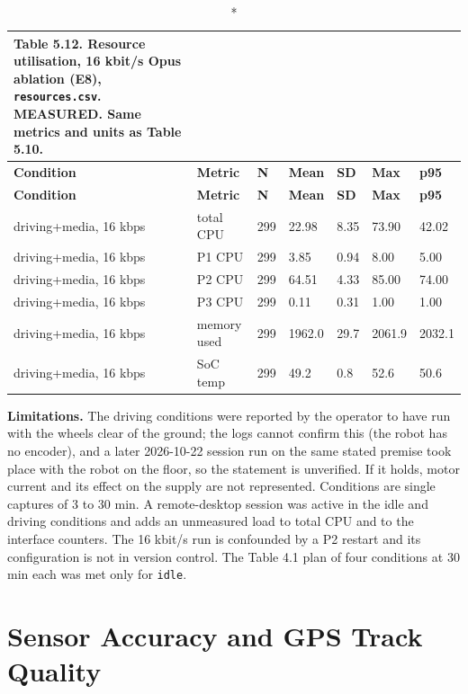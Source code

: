 \begin{center}
\footnotesize
\begin{longtable}{|p{4cm}|p{2.3cm}|l|l|l|l|l|}
\caption*{Table 5.12. Resource utilisation, 16 kbit/s Opus ablation (E8), \texttt{resources.csv}. MEASURED. Same metrics and units as Table 5.10.}
\addcontentsline{lot}{table}{\protect\numberline{5.12}Resource utilisation, 16 kbit/s Opus ablation (E8), \texttt{resources.csv}. MEASURED. Same metrics and units as Table 5.10.}
\\
\hline
\textbf{Condition} & \textbf{Metric} & \textbf{N} & \textbf{Mean} & \textbf{SD} & \textbf{Max} & \textbf{p95} \\
\hline
\endfirsthead
\hline
\textbf{Condition} & \textbf{Metric} & \textbf{N} & \textbf{Mean} & \textbf{SD} & \textbf{Max} & \textbf{p95} \\
\hline
\endhead
driving+media, 16 kbps & total CPU & 299 & 22.98 & 8.35 & 73.90 & 42.02 \\
\hline
driving+media, 16 kbps & P1 CPU & 299 & 3.85 & 0.94 & 8.00 & 5.00 \\
\hline
driving+media, 16 kbps & P2 CPU & 299 & 64.51 & 4.33 & 85.00 & 74.00 \\
\hline
driving+media, 16 kbps & P3 CPU & 299 & 0.11 & 0.31 & 1.00 & 1.00 \\
\hline
driving+media, 16 kbps & memory used & 299 & 1962.0 & 29.7 & 2061.9 & 2032.1 \\
\hline
driving+media, 16 kbps & SoC temp & 299 & 49.2 & 0.8 & 52.6 & 50.6 \\
\hline
\end{longtable}
\end{center}

\textbf{Limitations.} The driving conditions were reported by the operator to have run with the wheels clear of the ground; the logs cannot confirm this (the robot has no encoder), and a later 2026-10-22 session run on the same stated premise took place with the robot on the floor, so the statement is unverified. If it holds, motor current and its effect on the supply are not represented. Conditions are single captures of 3 to 30 min. A remote-desktop session was active in the idle and driving conditions and adds an unmeasured load to total CPU and to the interface counters. The 16 kbit/s run is confounded by a P2 restart and its configuration is not in version control. The Table 4.1 plan of four conditions at 30 min each was met only for \texttt{idle}.

\section{Sensor Accuracy and GPS Track Quality}

